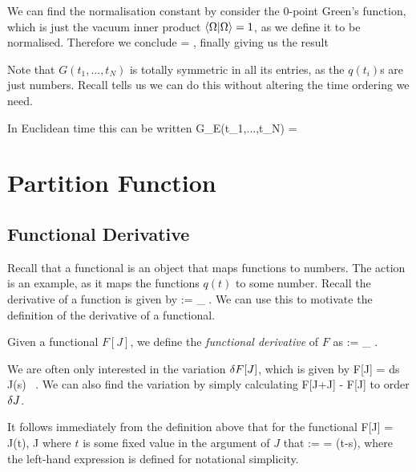 We can find the normalisation constant by consider the $0$-point Green's function, which is just the vacuum inner product $\braket{\Omega}{\Omega} =1$, as we define it to be normalised. Therefore we conclude 
\bse
    \cN = , 
\ese 
finally giving us the result 

\br 
    Note that $G(t_1,...,t_N)$ is totally symmetric in all its entries, as the $q(t_i)$s are just numbers. Recall  tells us we can do this without altering the time ordering we need.  
\er 

In Euclidean time this can be written 
\bse 
    G_E(t_1,...,t_N) = 
\ese

\section{Partition Function}

\subsection{Functional Derivative}

Recall that a functional is an object that maps functions to numbers. The action is an example, as it maps the functions $q(t)$ to some number. Recall the derivative of a function is given by 
\bse 
     := \lim_{\epsilon{}} .
\ese
We can use this to motivate the definition of the derivative of a functional. 

    Given a functional $F[J]$, we define the \textit{functional derivative} of $F$ as 
    \be 
    \label{eqn:FunctionalDerivative}
         := \lim_{\epsilon{}} .
    \ee 
\ed 

We are often only interested in the variation $\delta F[J]$, which is given by
\be 
\label{eqn:VaritaionOfFunctional}
    \del F[J] = \int ds \, \del J(s) \, .
\ee 
We can also find the variation by simply calculating 
\bse 
    F[J+\del J] - F[J]
\ese 
to order $\delta J$.

\bc 
    It follows immediately from the definition above that for the functional 
    \bse 
        F[J] = J(t), \qquad \forall J
    \ese 
    where $t$ is some fixed value in the argument of $J$ that 
    \bse 
         :=  = \del(t-s),
    \ese 
    where the left-hand expression is defined for notational simplicity.
\ec 

